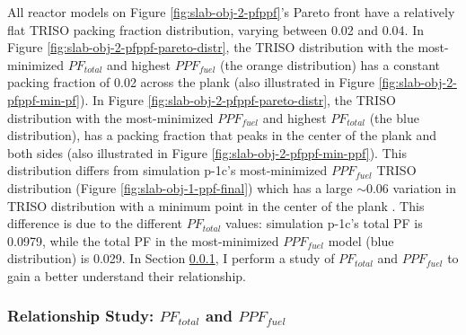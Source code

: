 All reactor models on Figure \ref{fig:slab-obj-2-pfppf}'s Pareto front have a relatively 
flat TRISO packing fraction distribution, varying between 0.02 and 0.04. 
In Figure \ref{fig:slab-obj-2-pfppf-pareto-distr}, the TRISO distribution with the 
most-minimized $PF_{total}$ and highest $PPF_{fuel}$
(the orange distribution) has a constant packing fraction of 0.02 across the plank
(also illustrated in Figure \ref{fig:slab-obj-2-pfppf-min-pf}). 
In Figure \ref{fig:slab-obj-2-pfppf-pareto-distr}, the TRISO distribution with the 
most-minimized $PPF_{fuel}$ and highest $PF_{total}$
(the blue distribution), has a packing fraction that peaks in the center of the plank
and both sides (also illustrated in Figure \ref{fig:slab-obj-2-pfppf-min-ppf}). 
This distribution differs from simulation p-1c's most-minimized $PPF_{fuel}$ TRISO 
distribution (Figure \ref{fig:slab-obj-1-ppf-final}) which has a large $\sim 0.06$ 
variation in TRISO distribution with a minimum point in the center of the plank . 
This difference is due to the different $PF_{total}$ values: simulation p-1c's total PF 
is 0.0979, while the total PF in the most-minimized $PPF_{fuel}$ model 
(blue distribution) is 0.029. 
In Section \ref{sec:p-2b-pf-ppf-study}, I perform a study of $PF_{total}$ 
and $PPF_{fuel}$ to gain a better understand their relationship. 

\subsubsection{Relationship Study: $PF_{total}$ and $PPF_{fuel}$}
\label{sec:p-2b-pf-ppf-study}

